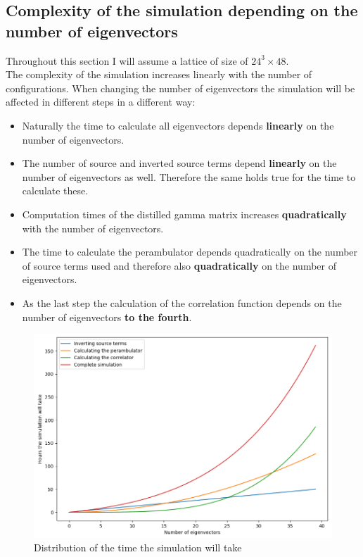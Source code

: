 \subsection{Complexity of the simulation depending on the number of eigenvectors}

Throughout this section I will assume a lattice of size of $24^3 \times 48$.\\

\noindent
The complexity of the simulation increases linearly with the number of configurations. When changing the number of eigenvectors the simulation will be affected in different steps in a different way:

\begin{itemize}
    \item Naturally the time to calculate all eigenvectors depends \textbf{linearly} on the number of eigenvectors.
    \item The number of source and inverted source terms depend \textbf{linearly} on the number of eigenvectors as well. Therefore the same holds true for the time to calculate these.
    \item Computation times of the distilled gamma matrix increases \textbf{quadratically} with the number of eigenvectors.
    \item The time to calculate the perambulator depends quadratically on the number of source terms used and therefore also \textbf{quadratically} on the number of eigenvectors.
    \item As the last step the calculation of the correlation function depends on the number of eigenvectors \textbf{to the fourth}.
\end{itemize}

\begin{figure}[H]
        \centering
        \includegraphics[width=1\textwidth]{images/time_of_sim.png}
        \caption{Distribution of the time the simulation will take}
        \label{time_of_sim}
    \end{figure}

